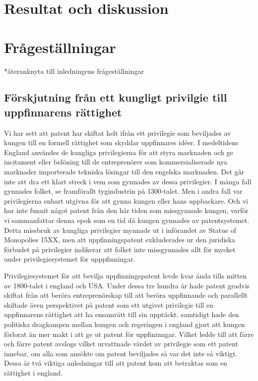 \section{Resultat och diskussion}



\section{Frågeställningar}
*återanknyta till inledningens frågeställningar



\subsection{Förskjutning från ett kungligt privilgie till uppfinnarens rättighet}
Vi har sett att patent har skiftat helt ifrån ett privilegie som beviljades av kungen till en formell rättighet som skyddar uppfinnares idéer. I medeltidens England användes de kungliga privilegierna för att styra marknaden och ge incitament eller belöning till de entreprenörer som kommersialiserade nya marknader importerade tekniska lösingar till den engelska marknaden. Det går inte att dra ett klart streck i vem som gynnades av dessa privilegier. I många fall gynnades folket, se framförallt tygindustrin på 1300-talet. Men i andra fall var privilegierna enbart utgivna för att gynna kungen eller hans uppbackare.%
Och vi har inte funnit något patent från den här tiden som missgynnade kungen, varför vi sammanfattar denna epok som en tid då kungen gynnades av patentsystemet. Detta missbruk av kungliga privilegier mynnade ut i införandet av Statue of Monopolies 15XX, men att uppfinningspatent exkluderades ur den juridiska förbudet på privilegier indikerar att folket inte missgynnades allt för mycket under privilegiesystemet för upppfinningar.

Privilegiesystemet för att bevilja uppfinningspatent levde kvar ända tills mitten av 1800-talet i england och USA. Under dessa tre hundra år hade patent gradvis skiftat från att beröra entreprenörskap till att beröra uppfinnande och parallellt skiftade även perspektivet på patent som ett utgivet privilegie till en uppfinnarens rättighet att ha ensamrätt till sin upptäckt. samtidigt hade den politiska dragkampen mellan kungen och regeringen i england gjort att kungen förlorat än mer makt i att ge ut patent för uppfininngar. Vilket ledde till att färre och färre patent avslogs vilket urvattnade värdet av privilegie som ett patent innebar, om alla som ansökte om patent beviljades så var det inte så viktigt. Dessa är två viktiga anledningar till att patent kom att betraktas som en rättighet i england.

